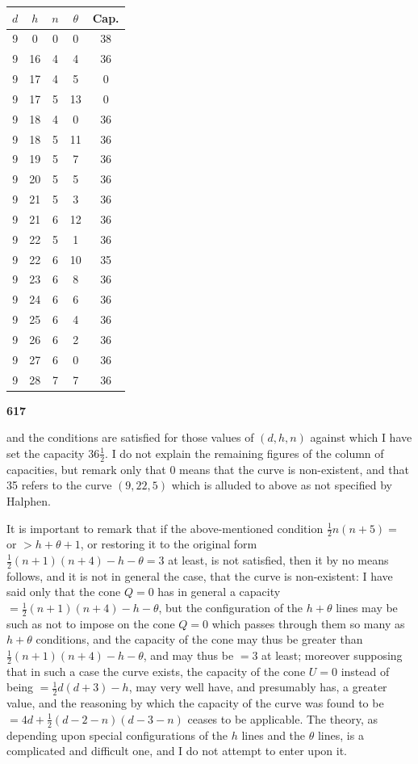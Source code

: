 \documentclass[12pt,a4paper]{article}
\theoremstyle{plain}
\begin{document}
\begin{center}
\begin{tabular}{|c|c|c|c|c|}
\hline
$d$ & $h$ & $n$ & $\theta$ & Cap. \\
\hline
9 & 0 & 0 & 0 & 38 \\
9 & 16 & 4 & 4 & 36 \\
9 & 17 & 4 & 5 & 0 \\
9 & 17 & 5 & 13 & 0 \\
9 & 18 & 4 & 0 & 36 \\
9 & 18 & 5 & 11 & 36 \\
9 & 19 & 5 & 7 & 36 \\
9 & 20 & 5 & 5 & 36 \\
9 & 21 & 5 & 3 & 36 \\
9 & 21 & 6 & 12 & 36 \\
9 & 22 & 5 & 1 & 36 \\
9 & 22 & 6 & 10 & 35 \\
9 & 23 & 6 & 8 & 36 \\
9 & 24 & 6 & 6 & 36 \\
9 & 25 & 6 & 4 & 36 \\
9 & 26 & 6 & 2 & 36 \\
9 & 27 & 6 & 0 & 36 \\
9 & 28 & 7 & 7 & 36 \\
\hline
\end{tabular}
\end{center}

\newpage
\noindent\textbf{617}

and the conditions are satisfied for those values of $(d,h,n)$ against which I have set the capacity $36\frac{1}{2}$. I do not explain the remaining figures of the column of capacities, but remark only that 0 means that the curve is non-existent, and that 35 refers to the curve $(9,22,5)$ which is alluded to above as not specified by Halphen.

It is important to remark that if the above-mentioned condition $\frac{1}{2}n(n+5)=$ or $>h+\theta+1$, or restoring it to the original form $\frac{1}{2}(n+1)(n+4)-h-\theta=3$ at least, is not satisfied, then it by no means follows, and it is not in general the case, that the curve is non-existent: I have said only that the cone $Q=0$ has in general a capacity $=\frac{1}{2}(n+1)(n+4)-h-\theta$, but the configuration of the $h+\theta$ lines may be such as not to impose on the cone $Q=0$ which passes through them so many as $h+\theta$ conditions, and the capacity of the cone may thus be greater than $\frac{1}{2}(n+1)(n+4)-h-\theta$, and may thus be $=3$ at least; moreover supposing that in such a case the curve exists, the capacity of the cone $U=0$ instead of being $=\frac{1}{2}d(d+3)-h$, may very well have, and presumably has, a greater value, and the reasoning by which the capacity of the curve was found to be $=4d+\frac{1}{2}(d-2-n)(d-3-n)$ ceases to be applicable. The theory, as depending upon special configurations of the $h$ lines and the $\theta$ lines, is a complicated and difficult one, and I do not attempt to enter upon it.
\end{document}
